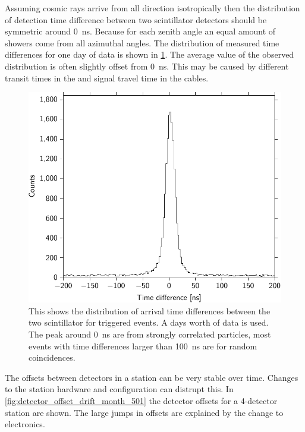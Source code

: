Assuming cosmic rays arrive from all direction isotropically then the distribution of detection time difference between two scintillator detectors should be symmetric around \SI{0}{\ns}. Because for each zenith angle an equal amount of showers come from all azimuthal angles. The distribution of measured time differences for one day of data is shown in \cref{fig:detector_time_difference_distribution}. The average value of the observed distribution is often slightly offset from \SI{0}{\ns}. This may be caused by different transit times in the \pmt and signal travel time in the cables.

\begin{figure}
    \centering
    \includegraphics{plots/station/detector_time_difference_distribution}
    \caption{This shows the distribution of arrival time differences between the two scintillator for triggered events. A days worth of data is used. The peak around \SI{0}{\ns} are from strongly correlated particles, most events with time differences larger than \SI{100}{\ns} are for random coincidences.}
    \label{fig:detector_time_difference_distribution}
\end{figure}

The offsets between detectors in a station can be very stable over time. Changes to the station hardware and configuration can distrupt this. In \cref{fig:detector_offset_drift_month_501} the detector offsets for a 4-detector station are shown. The large jumps in offsets are explained by the change to \hisparciii electronics.

